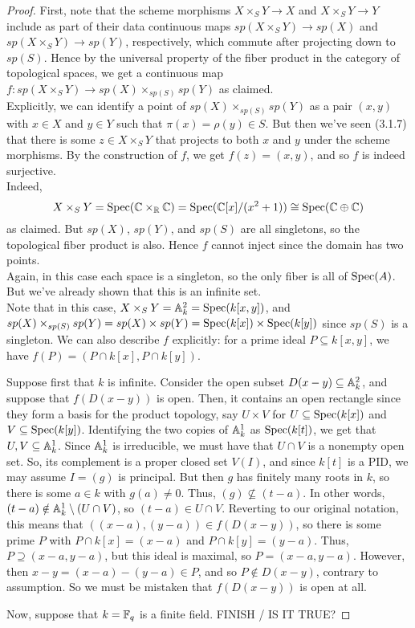 \begin{proof}
	First, note that the scheme morphisms $X \times_S Y \to X$ and $X \times_S Y \to Y$ include as part of their data continuous maps $sp(X \times_S Y) \to sp(X)$ and $sp(X \times_S Y) \to sp(Y)$, respectively, which commute after projecting down to $sp(S)$. Hence by the universal property of the fiber product in the category of topological spaces, we get a continuous map $f : sp(X \times_S Y) \to sp(X) \times_{sp(S)} sp(Y)$ as claimed. \\
	
	Explicitly, we can identify a point of $sp(X) \times_{sp(S)} sp(Y)$ as a pair $(x,y)$ with $x \in X$ and $y \in Y$ such that $\pi(x) = \rho(y) \in S$. But then we've seen (3.1.7) that there is some $z \in X \times_S Y$ that projects to both $x$ and $y$ under the scheme morphisms. By the construction of $f$, we get $f(z) = (x,y)$, and so $f$ is indeed surjective. \\
	
	Indeed,
	\[ X \times_S Y = \Spec(\CC \times_\RR \CC) = \Spec(\CC[x]/(x^2+1)) \cong \Spec(\CC \oplus \CC) \]
	as claimed. But $sp(X)$, $sp(Y)$, and $sp(S)$ are all singletons, so the topological fiber product is also. Hence $f$ cannot inject since the domain has two points. \\
	
	Again, in this case each space is a singleton, so the only fiber is all of $\Spec(A)$. But we've already shown that this is an infinite set. \\
	
	Note that in this case, $X \times_S Y = \AA_k^2 = \Spec(k[x,y])$, and $sp(X) \times_{sp(S)} sp(Y) = sp(X) \times sp(Y) = \Spec(k[x]) \times \Spec(k[y])$ since $sp(S)$ is a singleton. We can also describe $f$ explicitly: for a prime ideal $P \subseteq k[x,y]$, we have $f(P) = (P \cap k[x], P \cap k[y])$.
	
	Suppose first that $k$ is infinite. Consider the open subset $D(x-y) \subseteq \AA_k^2$, and suppose that $f(D(x-y))$ is open. Then, it contains an open rectangle since they form a basis for the product topology, say $U \times V$ for $U \subseteq \Spec(k[x])$ and $V \subseteq \Spec(k[y])$. Identifying the two copies of $\AA_k^1$ as $\Spec(k[t])$, we get that $U,V \subseteq \AA_k^1$. Since $\AA_k^1$ is irreducible, we must have that $U \cap V$ is a nonempty open set. So, its complement is a proper closed set $V(I)$, and since $k[t]$ is a PID, we may assume $I = (g)$ is principal. But then $g$ has finitely many roots in $k$, so there is some $a \in k$ with $g(a) \neq 0$. Thus, $(g) \not\subseteq (t-a)$. In other words, $(t-a) \notin \AA_k^1 \setminus (U \cap V)$, so $(t-a) \in U \cap V$. Reverting to our original notation, this means that $((x-a),(y-a)) \in f(D(x-y))$, so there is some prime $P$ with $P \cap k[x] = (x-a)$ and $P \cap k[y] = (y-a)$. Thus, $P \supseteq (x-a,y-a)$, but this ideal is maximal, so $P = (x-a,y-a)$. However, then $x-y = (x-a)-(y-a) \in P$, and so $P \notin D(x-y)$, contrary to assumption. So we must be mistaken that $f(D(x-y))$ is open at all.
	
	Now, suppose that $k = \FF_q$ is a finite field. FINISH / IS IT TRUE?
\end{proof}
